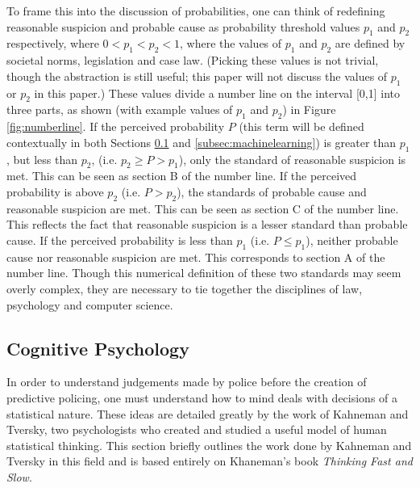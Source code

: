 \documentclass[12pt]{article} %
\begin{document}
To frame this into the discussion of probabilities, one can think of redefining reasonable suspicion and probable cause as probability threshold values $p_1$ and $p_2$ respectively, where $0 < p_1 < p_2 < 1$, where the values of $p_1$ and $p_2$ are defined by societal norms, legislation and case law. (Picking these values is not trivial, though the abstraction is still useful; this paper will not discuss the values of $p_1$ or $p_2$ in this paper.) These values divide a number line on the interval [0,1] into three parts, as shown (with example values of $p_1$ and $p_2$) in Figure \ref{fig:numberline}. If the perceived probability $P$ (this term will be defined contextually in both Sections \ref{subsec:cognitive} and \ref{subsec:machinelearning}) is greater than $p_1$, but less than $p_2$, (i.e. $p_2 \geq P > p_1$), only the standard of reasonable suspicion is met. This can be seen as section B of the number line. If the perceived probability is above $p_2$ (i.e. $P > p_2$), the standards of probable cause and reasonable suspicion are met. This can be seen as section C of the number line. This reflects the fact that reasonable suspicion is a lesser standard than probable cause. If the perceived probability is less than $p_1$ (i.e. $P \leq p_1$), neither probable cause nor reasonable suspicion are met. This corresponds to section A of the number line. Though this numerical definition of these two standards may seem overly complex, they are necessary to tie together the disciplines of law, psychology and computer science.

\subsection{Cognitive Psychology} \label{subsec:cognitive}
In order to understand judgements made by police before the creation of predictive policing, one must understand how to mind deals with decisions of a statistical nature. These ideas are detailed greatly by the work of Kahneman and Tversky, two psychologists who created and studied a useful model of human statistical thinking. This section briefly outlines the work done by Kahneman and Tversky in this field and is based entirely on Khaneman's book \textit{Thinking Fast and Slow}.\cite{kahneman}
\end{document}

